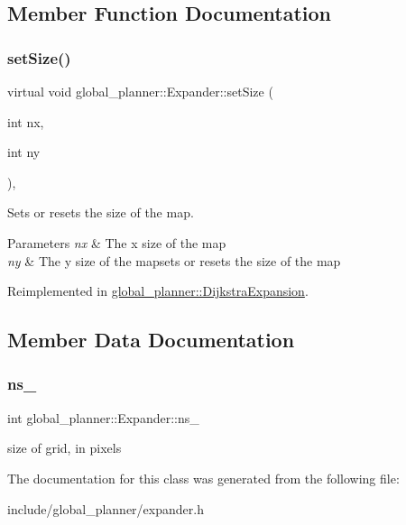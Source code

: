 \subsection{Member Function Documentation}
\mbox{\label{classglobal__planner_1_1_expander_aeeaa60103de1ee71a1969e40a3735094}} 
\subsubsection{\texorpdfstring{set\+Size()}{setSize()}}
{\footnotesize\ttfamily virtual void global\+\_\+planner\+::\+Expander\+::set\+Size (\begin{DoxyParamCaption}\item[{int}]{nx,  }\item[{int}]{ny }\end{DoxyParamCaption})\hspace{0.3cm}{\ttfamily [inline]}, {\ttfamily [virtual]}}



Sets or resets the size of the map. 


\begin{DoxyParams}{Parameters}
{\em nx} & The x size of the map \\
\hline
{\em ny} & The y size of the mapsets or resets the size of the map \\
\hline
\end{DoxyParams}


Reimplemented in \mbox{\hyperlink{classglobal__planner_1_1_dijkstra_expansion_a7d286126b2c478fc55c5e995e1deff29}{global\+\_\+planner\+::\+Dijkstra\+Expansion}}.



\subsection{Member Data Documentation}
\mbox{\label{classglobal__planner_1_1_expander_a0538b977e9cd0022810096b79e61e529}} 
\subsubsection{\texorpdfstring{ns\+\_\+}{ns\_}}
{\footnotesize\ttfamily int global\+\_\+planner\+::\+Expander\+::ns\+\_\+\hspace{0.3cm}{\ttfamily [protected]}}

size of grid, in pixels 

The documentation for this class was generated from the following file\+:\begin{DoxyCompactItemize}
\item 
include/global\+\_\+planner/expander.\+h\end{DoxyCompactItemize}
